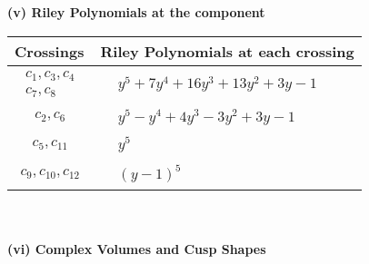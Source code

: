 \documentclass[1p]{elsarticle_modified}
\theoremstyle{definition}
\begin{document}
\newpage\renewcommand{\arraystretch}{1}
\flushleft \textbf{(v) Riley Polynomials at the component}\newline \\
\begin{tabular}{m{50pt}|m{274pt}}
Crossings & \hspace{64pt}Riley Polynomials at each crossing \\
\hline $$\begin{aligned}c_{1},c_{3},c_{4}\\c_{7},c_{8}\end{aligned}$$&$\begin{aligned}
&y^5+7 y^4+16 y^3+13 y^2+3 y-1
\end{aligned}$\\
\hline $$\begin{aligned}c_{2},c_{6}\end{aligned}$$&$\begin{aligned}
&y^5- y^4+4 y^3-3 y^2+3 y-1
\end{aligned}$\\
\hline $$\begin{aligned}c_{5},c_{11}\end{aligned}$$&$\begin{aligned}
&y^5
\end{aligned}$\\
\hline $$\begin{aligned}c_{9},c_{10},c_{12}\end{aligned}$$&$\begin{aligned}
&(y-1)^5
\end{aligned}$\\
\hline
\end{tabular}\\~\\
\newpage\flushleft \textbf{(vi) Complex Volumes and Cusp Shapes}
\end{document}
